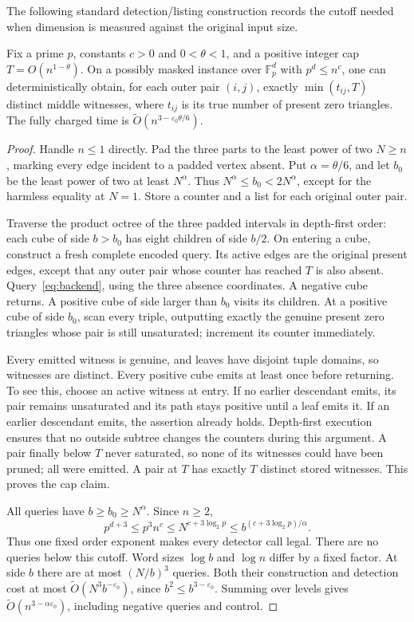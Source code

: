 \documentclass[manuscript,screen,nonacm,11pt]{acmart}
\newcommand{\F}{\mathbb F}
\newcommand{\Ot}{\widetilde O}
\newcommand{\eps}{\varepsilon_0}
\begin{document}
The following standard detection/listing construction records the cutoff
needed when dimension is measured against the original input size.

\begin{lemma}\label{lem:capped}
Fix a prime $p$, constants $c>0$ and $0<\theta<1$, and a positive integer
cap $T=O(n^{1-\theta})$. On a possibly masked instance over $\F_p^d$ with
$p^d\le n^c$, one can deterministically obtain, for each outer pair $(i,j)$,
exactly $\min(t_{ij},T)$ distinct middle witnesses, where $t_{ij}$ is its
true number of present zero triangles. The fully charged time is
$\Ot(n^{3-\eps\theta/6})$.
\end{lemma}
\begin{proof}
Handle $n\le1$ directly. Pad the three parts to the least power of two
$N\ge n$, marking every edge incident to a padded vertex absent. Put
$\alpha=\theta/6$, and let $b_0$ be the least power of two at least
$N^\alpha$. Thus $N^\alpha\le b_0<2N^\alpha$, except for the harmless
equality at $N=1$. Store a counter and a list for each original outer pair.

Traverse the product octree of the three padded intervals in depth-first
order: each cube of side $b>b_0$ has eight children of side $b/2$. On
entering a cube, construct a fresh complete encoded query. Its active edges
are the original present edges, except that any outer pair whose counter
has reached $T$ is also absent. Query~\eqref{eq:backend}, using the three
absence coordinates. A negative cube returns. A positive cube of side
larger than $b_0$ visits its children. At a positive cube of side $b_0$,
scan every triple, outputting exactly the genuine present zero triangles
whose pair is still unsaturated; increment its counter immediately.

Every emitted witness is genuine, and leaves have disjoint tuple domains,
so witnesses are distinct. Every positive cube emits at least once before
returning. To see this, choose an active witness at entry. If no earlier
descendant emits, its pair remains unsaturated and its path stays positive
until a leaf emits it. If an earlier descendant emits, the assertion already
holds. Depth-first execution ensures that no outside subtree changes the
counters during this argument. A pair finally below $T$ never saturated,
so none of its witnesses could have been pruned; all were emitted. A pair
at $T$ has exactly $T$ distinct stored witnesses. This proves the cap claim.

All queries have $b\ge b_0\ge N^\alpha$. Since $n\ge2$,
\[
 p^{d+3}\le p^3n^c\le N^{c+3\log_2 p}
       \le b^{(c+3\log_2 p)/\alpha}.
\]
Thus one fixed order exponent makes every detector call legal. There are no
queries below this cutoff. Word sizes $\log b$ and $\log n$ differ by a
fixed factor. At side $b$ there are at most $(N/b)^3$ queries. Both their
construction and detection cost at most
$\Ot(N^3b^{-\eps})$, since $b^2\le b^{3-\eps}$. Summing over levels
gives $\Ot(n^{3-\alpha\eps})$, including negative queries and control.


\end{proof}
\end{document}
